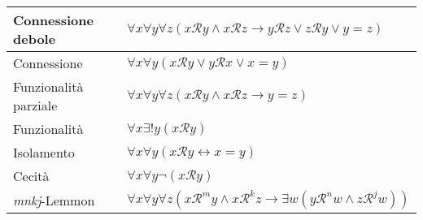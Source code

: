\documentclass[a4paper,12pt]{article}
\begin{document}
\begin{center}
\begin{tabular}{|l|l|}
		\hline
		Connessione debole    & $\forall x \forall y \forall z (x\mathcal{R}y \land x\mathcal{R}z \to y\mathcal{R}z \lor z\mathcal{R}y \lor y=z)$             \\
		\hline
		Connessione           & $\forall x \forall y (x\mathcal{R}y \lor y\mathcal{R}x \lor x=y)$                                                             \\
		\hline
		Funzionalità parziale & $\forall x \forall y \forall z (x\mathcal{R}y \land x\mathcal{R}z \to y=z)$                                                   \\
		\hline
		Funzionalità          & $\forall x \exists ! y (x\mathcal{R}y)$                                                                                       \\
		\hline
		Isolamento            & $\forall x \forall y (x\mathcal{R}y \leftrightarrow x=y)$                                                                     \\
		\hline
		Cecità                & $\forall x \forall y \lnot (x\mathcal{R}y)$                                                                                   \\
		\hline
		\emph{mnkj}-Lemmon    & $\forall x \forall y \forall z (x\mathcal{R}^my \land x\mathcal{R}^kz \to \exists w (y\mathcal{R}^nw \land z\mathcal{R}^jw))$ \\
		\hline
	\end{tabular}


\end{center}
\end{document}
